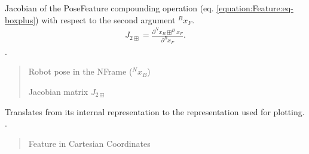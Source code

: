 \documentclass[letterpaper,10pt,english]{sphinxmanual}
\begin{document}
\begin{fulllineitems}
\begin{fulllineitems}
\end{fulllineitems}


\begin{fulllineitems}
\label{\detokenize{Feature:Feature.Feature.J_2boxplus}}
\pysigstartsignatures
{}
\pysigstopsignatures
\sphinxAtStartPar
Jacobian of the Pose\sphinxhyphen{}Feature compounding operation (eq. \eqref{equation:Feature:eq-boxplus}) with respect to the second argument \(^Bx_F\).
\begin{equation}\label{equation:Feature:eq-boxplus}
\begin{split}J_{2\boxplus}=\frac{\partial ^Nx_B \boxplus ^Bx_F}{\partial ^Bx_F}.\end{split}
\end{equation}
\sphinxAtStartPar
{}.
\begin{quote}\begin{description}
\sphinxAtStartPar
{} \textendash{} Robot pose in the N\sphinxhyphen{}Frame (\(^Nx_B\))

\sphinxAtStartPar
Jacobian matrix \(J_{2\boxplus}\)

\end{description}\end{quote}

\end{fulllineitems}


\begin{fulllineitems}
\label{\detokenize{Feature:Feature.Feature.ToCartesian}}
\pysigstartsignatures
{}
\pysigstopsignatures
\sphinxAtStartPar
Translates from its internal representation to the representation used for plotting.
.
\begin{quote}\begin{description}
\sphinxAtStartPar
Feature in Cartesian Coordinates

\end{description}\end{quote}


\end{fulllineitems}
\end{fulllineitems}
\end{document}
